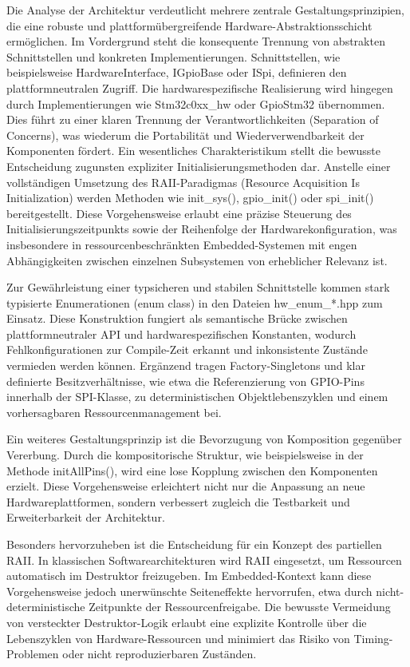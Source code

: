\vspace{0.5cm}
\vspace{0.5cm}

Die Analyse der Architektur verdeutlicht mehrere zentrale Gestaltungsprinzipien, die eine robuste und plattformübergreifende Hardware-Abstraktionsschicht ermöglichen. 
Im Vordergrund steht die konsequente Trennung von abstrakten Schnittstellen und konkreten Implementierungen. 
Schnittstellen, wie beispielsweise HardwareInterface, IGpioBase oder ISpi, definieren den plattformneutralen Zugriff. 
Die hardwarespezifische Realisierung wird hingegen durch Implementierungen wie Stm32c0xx\_hw oder GpioStm32 übernommen.
Dies führt zu einer klaren Trennung der Verantwortlichkeiten (Separation of Concerns), was wiederum die Portabilität und Wiederverwendbarkeit der Komponenten fördert.
Ein wesentliches Charakteristikum stellt die bewusste Entscheidung zugunsten expliziter Initialisierungsmethoden dar. 
Anstelle einer vollständigen Umsetzung des RAII-Paradigmas (Resource Acquisition Is Initialization) werden Methoden wie init\_sys(), gpio\_init() oder spi\_init() bereitgestellt. 
Diese Vorgehensweise erlaubt eine präzise Steuerung des Initialisierungszeitpunkts sowie der Reihenfolge der Hardwarekonfiguration, was insbesondere in ressourcenbeschränkten Embedded-Systemen mit engen Abhängigkeiten zwischen einzelnen Subsystemen von erheblicher Relevanz ist.

Zur Gewährleistung einer typsicheren und stabilen Schnittstelle kommen stark typisierte Enumerationen (enum class) in den Dateien hw\_enum\_*.hpp zum Einsatz. 
Diese Konstruktion fungiert als semantische Brücke zwischen plattformneutraler API und hardwarespezifischen Konstanten, wodurch Fehlkonfigurationen zur Compile-Zeit erkannt und inkonsistente Zustände vermieden werden können. 
Ergänzend tragen Factory-Singletons und klar definierte Besitzverhältnisse, wie etwa die Referenzierung von GPIO-Pins innerhalb der SPI-Klasse, zu deterministischen Objektlebenszyklen und einem vorhersagbaren Ressourcenmanagement bei.

Ein weiteres Gestaltungsprinzip ist die Bevorzugung von Komposition gegenüber Vererbung. 
Durch die kompositorische Struktur, wie beispielsweise in der Methode initAllPins(), wird eine lose Kopplung zwischen den Komponenten erzielt. 
Diese Vorgehensweise erleichtert nicht nur die Anpassung an neue Hardwareplattformen, sondern verbessert zugleich die Testbarkeit und Erweiterbarkeit der Architektur.

Besonders hervorzuheben ist die Entscheidung für ein Konzept des partiellen RAII. 
In klassischen Softwarearchitekturen wird RAII eingesetzt, um Ressourcen automatisch im Destruktor freizugeben. 
Im Embedded-Kontext kann diese Vorgehensweise jedoch unerwünschte Seiteneffekte hervorrufen, etwa durch nicht-deterministische Zeitpunkte der Ressourcenfreigabe. 
Die bewusste Vermeidung von versteckter Destruktor-Logik erlaubt eine explizite Kontrolle über die Lebenszyklen von Hardware-Ressourcen und minimiert das Risiko von Timing-Problemen oder nicht reproduzierbaren Zuständen.

